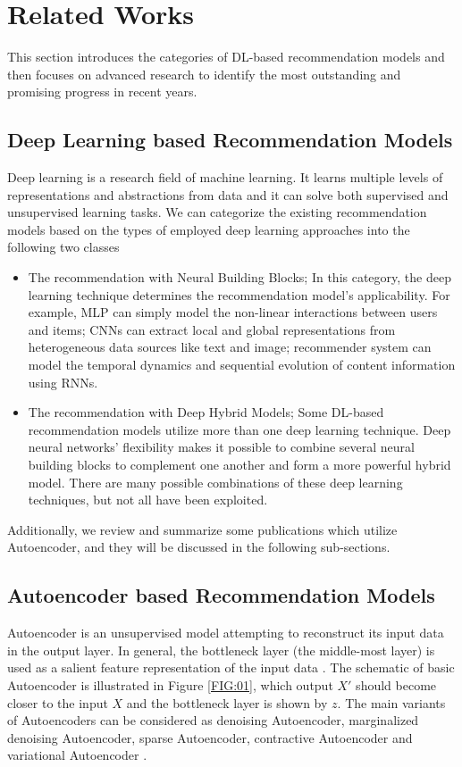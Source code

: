 \documentclass[a4paper,fleqn]{cas-dc}
\begin{document}
\section{Related Works}
\label{relatedworks}
This section introduces the categories of DL-based recommendation models and then focuses on advanced research to identify the most outstanding and promising progress in recent years.

\subsection{Deep Learning based Recommendation Models}
Deep learning is a research field of machine learning. It learns multiple levels of representations and abstractions from data and it can solve both supervised and unsupervised learning tasks. We can categorize the existing recommendation models based on the types of employed deep learning approaches into the following two classes \citep{29zhang2019a}

\begin{itemize}

	\item The recommendation with Neural Building Blocks; In this category, the deep learning technique determines the recommendation model's applicability. For example, MLP can simply model the non-linear interactions between users and items; CNNs can extract local and global representations from heterogeneous data sources like text and image; recommender system can model the temporal dynamics and sequential evolution of content information using RNNs.
	\item The recommendation with Deep Hybrid Models; Some DL-based recommendation models utilize more than one deep learning technique. Deep neural networks' flexibility makes it possible to combine several neural building blocks to complement one another and form a more powerful hybrid model. There are many possible combinations of these deep learning techniques, but not all have been exploited.
\end{itemize}

Additionally, we review and summarize some publications which utilize Autoencoder, and they will be discussed in the following sub-sections.


\subsection{Autoencoder based Recommendation Models}
Autoencoder is an unsupervised model attempting to reconstruct its input data in the output layer. In general, the bottleneck layer (the middle-most layer) is used as a salient feature representation of the input data \citep{29zhang2019a}. The schematic of basic Autoencoder is illustrated in Figure \ref{FIG:01}, which output $X'$ should become closer to the input $X$ and the bottleneck layer is shown by $z$. The main variants of Autoencoders can be considered as denoising Autoencoder, marginalized denoising Autoencoder, sparse Autoencoder, contractive Autoencoder and variational Autoencoder \citep{50goodfellow2016a}.
\end{document}
